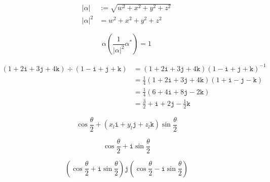 \documentclass{jlreq}
\newcommand{\ii}{\mathtt{i}}
\newcommand{\jj}{\mathtt{j}}
\newcommand{\kk}{\mathtt{k}}
\begin{document}
\begin{preview}
    \begin{align}
        |\alpha|   & := \sqrt{w^2 + x^2 + y^2 + z^2} \\
        |\alpha|^2 & = w^2 + x^2 + y^2 + z^2
    \end{align}
\end{preview}

\begin{preview}
    \begin{equation}
        \alpha \left(\frac{1}{|\alpha|^2} \alpha^*\right) = 1
    \end{equation}
\end{preview}

\begin{preview}
    \begin{align}
        (1 + 2 \ii + 3 \jj + 4 \kk) \div (1 - \ii + \jj + \kk) & = (1 + 2 \ii + 3 \jj + 4 \kk) (1 - \ii + \jj + \kk)^{-1}        \\
                                                               & = \frac{1}{4} (1 + 2 \ii + 3 \jj + 4 \kk) (1 + \ii - \jj - \kk) \\
                                                               & = \frac{1}{4} (6 + 4 \ii + 8 \jj - 2 \kk)                       \\
                                                               & = \frac{3}{2} + \ii + 2 \jj - \frac{1}{2} \kk
    \end{align}
\end{preview}

\begin{preview}
    \begin{equation}
        \cos \frac{\theta}{2} + (x_l \ii + y_l \jj + z_l \kk) \sin \frac{\theta}{2}
    \end{equation}
\end{preview}

\begin{preview}
    \begin{equation}
        \cos \frac{\theta}{2} + \ii \sin \frac{\theta}{2}
    \end{equation}
\end{preview}

\begin{preview}
    \begin{equation}
        \left( \cos \frac{\theta}{2} + \ii \sin \frac{\theta}{2} \right) \jj \left( \cos \frac{\theta}{2} - \ii \sin \frac{\theta}{2} \right)
    \end{equation}
\end{preview}
\end{document}

